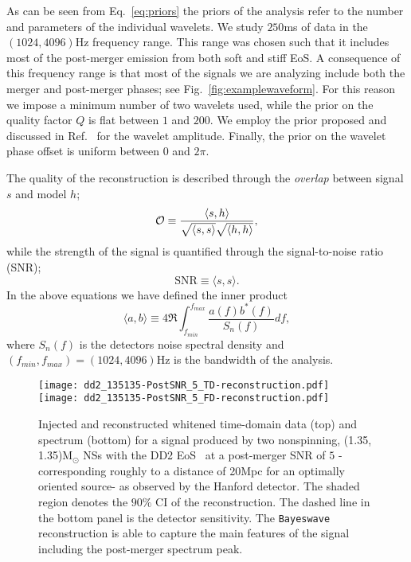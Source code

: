 \documentclass[aps,prd,amsmath,floats,floatfix, twocolumn,
superscriptaddress,nofootinbib,showpacs]{revtex4-1}
\begin{document}
As can be seen from Eq.~\eqref{eq:priors} the priors of the analysis refer to the number and parameters of the individual wavelets. We study $250$ms of data in the $(1024,4096)$Hz frequency range. This range was chosen such that it includes most of the post-merger emission from both soft and stiff EoS. A consequence of this frequency range is that most of the signals we are analyzing include both the merger and post-merger phases; see Fig.~\ref{fig:examplewaveform}. For this reason we impose a minimum number of two wavelets used, while the prior on the quality factor $Q$ is flat between $1$ and $200$. We employ the prior proposed and discussed in Ref.~\cite{Cornish:2014kda} for the wavelet amplitude. Finally, the prior on the wavelet phase offset is uniform between $0$ and $2\pi$.

The quality of the reconstruction is described through the \emph{overlap} between signal $s$ and model $h$;
%
\begin{equation}
{\cal{O}} \equiv \frac{\langle s,h \rangle}{\sqrt{\langle s,s \rangle} \sqrt{\langle h,h \rangle}},
\end{equation}
%
while the strength of the signal is quantified through the signal-to-noise ratio (SNR);
%
\begin{equation}
\text{SNR} \equiv \langle s,s \rangle.
\end{equation}
%
In the above equations we have defined the inner product
%
\begin{equation}
\langle a,b \rangle \equiv 4 \Re \int_{f_{min}}^{f_{max}} \frac{a(f)b^*(f)}{S_n(f)} df,
\end{equation}
%
where $S_n(f)$ is the detectors noise spectral density and $(f_{min},f_{max})=(1024,4096)$Hz is the bandwidth of the analysis. 

%
\begin{figure}[h!]
\texttt{[image: dd2\_135135-PostSNR\_5\_TD-reconstruction.pdf]}\\
\texttt{[image: dd2\_135135-PostSNR\_5\_FD-reconstruction.pdf]}
\caption{ \label{fig:dd2_135135_reconstruction} Injected and reconstructed whitened time-domain data (top) and spectrum (bottom) for a signal produced by two nonspinning, (1.35, 1.35)M$_{\odot}$ NSs with the DD2 EoS~\cite{2010NuPhA.837..210H,2010PhRvC..81a5803T} at a post-merger SNR of $5$ -corresponding roughly to a distance of 20Mpc for an optimally oriented source- as observed by the Hanford detector. The shaded region denotes the $90\%$ CI of the reconstruction. The dashed line in the bottom panel is the detector sensitivity. The {\tt Bayeswave} reconstruction is able to capture the main features of the signal including the post-merger spectrum peak. }
\end{figure}
%
\end{document}
